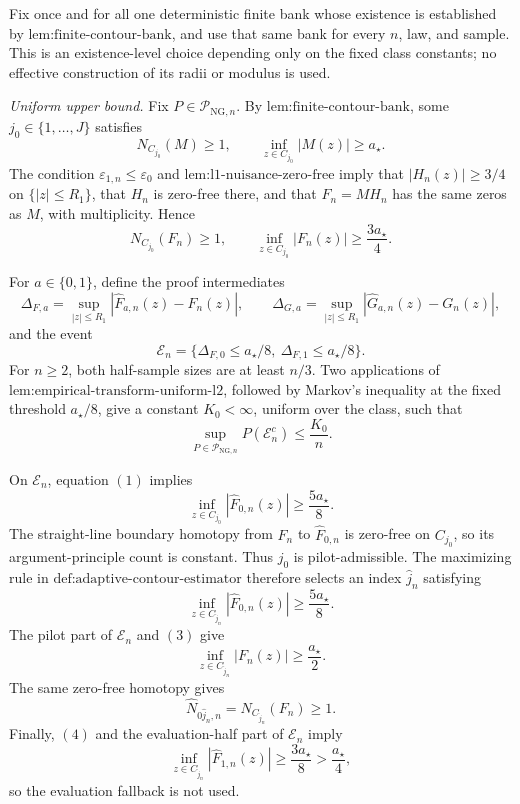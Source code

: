 Fix once and for all one deterministic finite bank whose existence is established by \(\text{lem:finite-contour-bank}\), and use that same bank for every \(n\), law, and sample.  This is an existence-level choice depending only on the fixed class constants; no effective construction of its radii or modulus is used.

\emph{Uniform upper bound.}
Fix \(P\in\mathcal P_{\mathrm{NG},n}\).  By \(\text{lem:finite-contour-bank}\), some \(j_0\in\{1,\ldots,J\}\) satisfies
\[
 N_{C_{j_0}}(M)\ge1,
 \qquad
 \inf_{z\in C_{j_0}}|M(z)|\ge a_{\star}.
\]
The condition \(\varepsilon_{1,n}\le\varepsilon_0\) and \(\text{lem:l1-nuisance-zero-free}\) imply that \(|H_n(z)|\ge3/4\) on \(\{|z|\le R_1\}\), that \(H_n\) is zero-free there, and that \(F_n=M H_n\) has the same zeros as \(M\), with multiplicity.  Hence
\[
 N_{C_{j_0}}(F_n)\ge1,
 \qquad
 \inf_{z\in C_{j_0}}|F_n(z)|\ge\frac{3a_{\star}}4. \tag{1}
\]

For \(a\in\{0,1\}\), define the proof intermediates
\[
 \Delta_{F,a}
 =\sup_{|z|\le R_1}|\widehat F_{a,n}(z)-F_n(z)|,
 \qquad
 \Delta_{G,a}
 =\sup_{|z|\le R_1}|\widehat G_{a,n}(z)-G_n(z)|,
\]
and the event
\[
 \mathcal E_n
 =\{\Delta_{F,0}\le a_{\star}/8,\ 
     \Delta_{F,1}\le a_{\star}/8\}.
\]
For \(n\ge2\), both half-sample sizes are at least \(n/3\).  Two applications of \(\text{lem:empirical-transform-uniform-l2}\), followed by Markov's inequality at the fixed threshold \(a_{\star}/8\), give a constant \(K_0<\infty\), uniform over the class, such that
\[
 \sup_{P\in\mathcal P_{\mathrm{NG},n}}P(\mathcal E_n^c)
 \le\frac{K_0}{n}. \tag{2}
\]

On \(\mathcal E_n\), equation \((1)\) implies
\[
 \inf_{z\in C_{j_0}}|\widehat F_{0,n}(z)|
 \ge\frac{5a_{\star}}8.
\]
The straight-line boundary homotopy from \(F_n\) to \(\widehat F_{0,n}\) is zero-free on \(C_{j_0}\), so its argument-principle count is constant.  Thus \(j_0\) is pilot-admissible.  The maximizing rule in \(\text{def:adaptive-contour-estimator}\) therefore selects an index \(\widehat j_n\) satisfying
\[
 \inf_{z\in C_{\widehat j_n}}|\widehat F_{0,n}(z)|
 \ge\frac{5a_{\star}}8. \tag{3}
\]
The pilot part of \(\mathcal E_n\) and \((3)\) give
\[
 \inf_{z\in C_{\widehat j_n}}|F_n(z)|
 \ge\frac{a_{\star}}2. \tag{4}
\]
The same zero-free homotopy gives
\[
 \widehat N_{0\widehat j_n,n}
 =N_{C_{\widehat j_n}}(F_n)\ge1. \tag{5}
\]
Finally, \((4)\) and the evaluation-half part of \(\mathcal E_n\) imply
\[
 \inf_{z\in C_{\widehat j_n}}|\widehat F_{1,n}(z)|
 \ge\frac{3a_{\star}}8>\frac{a_{\star}}4, \tag{6}
\]
so the evaluation fallback is not used.

